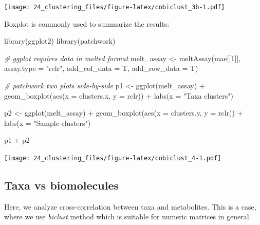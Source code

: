 \documentclass[
]{book}
\newenvironment{Shaded}{\begin{snugshade}}{\end{snugshade}}
\newcommand{\AttributeTok}[1]{\textcolor[rgb]{0.77,0.63,0.00}{#1}}
\newcommand{\CommentTok}[1]{\textcolor[rgb]{0.56,0.35,0.01}{\textit{#1}}}
\newcommand{\DecValTok}[1]{\textcolor[rgb]{0.00,0.00,0.81}{#1}}
\newcommand{\FunctionTok}[1]{\textcolor[rgb]{0.00,0.00,0.00}{#1}}
\newcommand{\NormalTok}[1]{#1}
\newcommand{\OtherTok}[1]{\textcolor[rgb]{0.56,0.35,0.01}{#1}}
\newcommand{\SpecialCharTok}[1]{\textcolor[rgb]{0.00,0.00,0.00}{#1}}
\newcommand{\StringTok}[1]{\textcolor[rgb]{0.31,0.60,0.02}{#1}}
\begin{document}
\texttt{[image: 24\_clustering\_files/figure-latex/cobiclust\_3b-1.pdf]}

Boxplot is commonly used to summarize the results:

\begin{Shaded}
\begin{Highlighting}[]
\FunctionTok{library}\NormalTok{(ggplot2)}
\FunctionTok{library}\NormalTok{(patchwork)}

\CommentTok{\# ggplot requires data in melted format}
\NormalTok{melt\_assay }\OtherTok{\textless{}{-}} \FunctionTok{meltAssay}\NormalTok{(mae[[}\DecValTok{1}\NormalTok{]], }\AttributeTok{assay.type =} \StringTok{"rclr"}\NormalTok{, }\AttributeTok{add\_col\_data =}\NormalTok{ T, }\AttributeTok{add\_row\_data =}\NormalTok{ T)}

\CommentTok{\# patchwork two plots side{-}by{-}side}
\NormalTok{p1 }\OtherTok{\textless{}{-}} \FunctionTok{ggplot}\NormalTok{(melt\_assay) }\SpecialCharTok{+}
  \FunctionTok{geom\_boxplot}\NormalTok{(}\FunctionTok{aes}\NormalTok{(}\AttributeTok{x =}\NormalTok{ clusters.x, }\AttributeTok{y =}\NormalTok{ rclr)) }\SpecialCharTok{+}
  \FunctionTok{labs}\NormalTok{(}\AttributeTok{x =} \StringTok{"Taxa clusters"}\NormalTok{)}

\NormalTok{p2 }\OtherTok{\textless{}{-}} \FunctionTok{ggplot}\NormalTok{(melt\_assay) }\SpecialCharTok{+}
  \FunctionTok{geom\_boxplot}\NormalTok{(}\FunctionTok{aes}\NormalTok{(}\AttributeTok{x =}\NormalTok{ clusters.y, }\AttributeTok{y =}\NormalTok{ rclr)) }\SpecialCharTok{+}
  \FunctionTok{labs}\NormalTok{(}\AttributeTok{x =} \StringTok{"Sample clusters"}\NormalTok{)}

\NormalTok{p1 }\SpecialCharTok{+}\NormalTok{ p2}
\end{Highlighting}
\end{Shaded}

\texttt{[image: 24\_clustering\_files/figure-latex/cobiclust\_4-1.pdf]}

\hypertarget{taxa-vs-biomolecules}{%
\subsection{Taxa vs biomolecules}\label{taxa-vs-biomolecules}}

Here, we analyze cross-correlation between taxa and metabolites. This
is a case, where we use \emph{biclust} method which is suitable for numeric
matrices in general.
\end{document}
